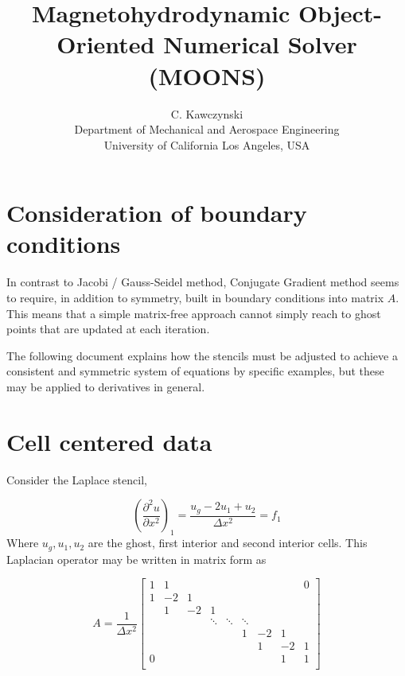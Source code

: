 \documentclass[landscape]{article}
\begin{document}
\doublespacing
\title{Magnetohydrodynamic Object-Oriented Numerical Solver (MOONS)}
\author{C. Kawczynski \\
Department of Mechanical and Aerospace Engineering \\
University of California Los Angeles, USA\\
}

\section{Consideration of boundary conditions}
In contrast to Jacobi / Gauss-Seidel method, Conjugate Gradient method seems to require, in addition to symmetry, built in boundary conditions into matrix $A$. This means that a simple matrix-free approach cannot simply reach to ghost points that are updated at each iteration.

The following document explains how the stencils must be adjusted to achieve a consistent and symmetric system of equations by specific examples, but these may be applied to derivatives in general.

\newpage
\section{Cell centered data}
Consider the Laplace stencil,

\begin{equation}
   \left(\frac{\partial^2 u}{\partial x^2}\right)_{1} =
   \frac{u_g - 2 u_1 + u_{2}}{\Delta x^2} = f_1
\end{equation}
Where $u_g,u_1,u_2$ are the ghost, first interior and second interior cells. This Laplacian operator may be written in matrix form as

\[ A = \frac{1}{\Delta x^2} \left[\begin{array}{ccccccccc}
1  & 1     &           &           &           &           &           &         &  0 \\
1  & -2    & 1         &           &           &           &           &         &    \\
   & 1     & -2        & 1         &           &           &           &         &    \\
   &       &           & \ddots    & \ddots    & \ddots    &           &         &    \\
   &       &           &           &           & 1         & -2        & 1       &    \\
   &       &           &           &           &           &  1        & -2      &  1 \\
0  &       &           &           &           &           &           & 1       &  1 \\
\end{array} \right]
\]
\end{document}
